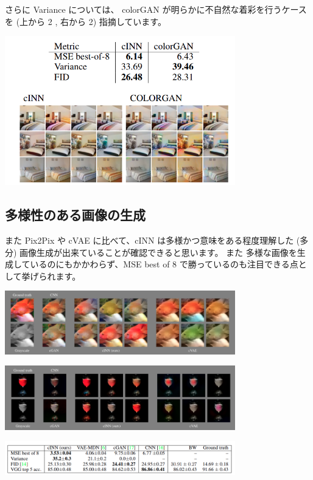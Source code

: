 \documentclass[a4paper, dvipdfmx, 10pt]{article}
\begin{document}
さらに Variance については、 colorGAN が明らかに不自然な着彩を行うケースを (上から 2 , 右から 2) 指摘しています。\\

\begin{center}
\includegraphics[width=10cm]{./img/vscolorgan.png}
\end{center}

\subsection{多様性のある画像の生成}
\label{sec:org3912e10}
また Pix2Pix や cVAE に比べて、cINN は多様かつ意味をある程度理解した (多分) 画像生成が出来ていることが確認できると思います。 また 多様な画像を生成しているのにもかかわらず、MSE best of 8 で勝っているのも注目できる点として挙げられます。\\

\begin{center}
\includegraphics[width=10cm]{./img/fish.png}
\end{center}

\begin{center}
\includegraphics[width=10cm]{./img/wine.png}
\end{center}

\begin{center}
\includegraphics[width=10cm]{./img/cinn_paint.png}
\end{center}
\end{document}
